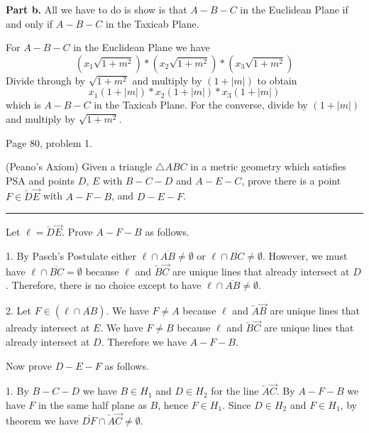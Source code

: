 \medskip\noindent
{\bf Part b.}
All we have to do is show is that $A{-}B{-}C$ in the Euclidean Plane if and only if
$A{-}B{-}C$ in the Taxicab Plane.

\medskip\noindent
For $A{-}B{-}C$ in the Euclidean Plane we have
$$(x_1\sqrt{1+m^2})*(x_2\sqrt{1+m^2})*(x_3\sqrt{1+m^2})$$
Divide through by $\sqrt{1+m^2}$ and multiply by $(1+|m|)$ to obtain
$$x_1(1+|m|)*x_2(1+|m|)*x_3(1+|m|)$$
which is $A{-}B{-}C$ in the Taxicab Plane.
For the converse, divide by $(1+|m|)$ and multiply by $\sqrt{1+m^2}$.









\vfill
\eject

\beginsection Page 80, problem 1.

(Peano's Axiom) Given a triangle $\triangle ABC$ in a metric geometry which satisfies PSA
and points $D$, $E$ with $B{-}C{-}D$ and $A{-}E{-}C$, prove there is a point
$F\in\overleftarrow D\overrightarrow E$ with $A{-}F{-}B$, and $D{-}E{-}F$.

\medskip\hrule

\bigskip\noindent
Let $\ell=\overleftarrow D\overrightarrow E$. Prove $A{-}F{-}B$ as follows.

\medskip
\item{1.} By Pasch's Postulate either $\ell\cap\overline{AB}\ne\emptyset$ or
$\ell\cap\overline{BC}\ne\emptyset$.
However, we must have $\ell\cap\overline{BC}=\emptyset$ because $\ell$ and
$\overleftarrow B\overrightarrow C$ are unique lines that already
intersect at $D$.
Therefore, there is no choice except to have $\ell\cap\overline{AB}\ne\emptyset$.

\medskip
\item{2.}
Let $F\in(\ell\cap\overline{AB})$.
%
We have $F\ne A$ because $\ell$ and
$\overleftarrow A\overrightarrow B$
are unique lines that already intersect at $E$.
%
We have $F\ne B$ because $\ell$ and
$\overleftarrow B\overrightarrow C$
are unique lines that already intersect at $D$.
%
Therefore we have $A{-}F{-}B$.

\medskip\noindent
Now prove $D{-}E{-}F$ as follows.
%
\medskip
\item{1.} By $B{-}C{-}D$ we have $B\in H_1$ and $D\in H_2$ for the line
$\overleftarrow A\overrightarrow C$.
%
By $A{-}F{-}B$ we have $F$ in the same half plane as $B$, hence $F\in H_1$.
%
Since $D\in H_2$ and $F\in H_1$, by theorem we have
$\overline{DF}\cap\overleftarrow A\overrightarrow C\ne\emptyset$.
%

